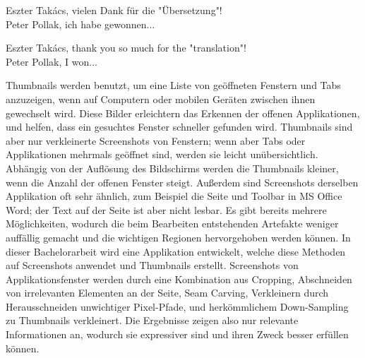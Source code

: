 \documentclass[draft,final]{vutinfth} %
\begin{document}
	
	\frontmatter %
	
	\addstatementpage
	
	\begin{danksagung*}
		Eszter Takács, vielen Dank für die "Übersetzung"! \\
		Peter Pollak, ich habe gewonnen...
	\end{danksagung*}
	
	\begin{acknowledgements*}
		Eszter Takács, thank you so much for the "translation"!\\
		Peter Pollak, I won...
	\end{acknowledgements*}
	
	\begin{kurzfassung} 
		Thumbnails werden benutzt, um eine Liste von geöffneten Fenstern und Tabs anzuzeigen, wenn auf Computern oder mobilen Geräten zwischen ihnen gewechselt wird.
		Diese Bilder erleichtern das Erkennen der offenen Applikationen, und helfen, dass ein gesuchtes Fenster schneller gefunden wird.
		Thumbnails sind aber nur verkleinerte Screenshots von Fenstern; wenn aber Tabs oder Applikationen mehrmals geöffnet sind, werden sie leicht unübersichtlich.
		Abhängig von der Auflösung des Bildschirms werden die Thumbnails kleiner, wenn die Anzahl der offenen Fenster steigt.
		Außerdem sind Screenshots derselben Applikation oft sehr ähnlich, zum Beispiel die Seite und Toolbar in MS Office Word; der Text auf der Seite ist aber nicht lesbar. 
		Es gibt bereits mehrere Möglichkeiten, wodurch die beim Bearbeiten entstehenden Artefakte weniger auffällig gemacht und die wichtigen Regionen hervorgehoben werden können.
		In dieser Bachelorarbeit wird eine Applikation entwickelt, welche diese Methoden auf Screenshots anwendet und Thumbnails erstellt.
		Screenshots von Applikationsfenster werden durch eine Kombination aus Cropping, Abschneiden von irrelevanten Elementen an der Seite, Seam Carving, Verkleinern durch Herausschneiden unwichtiger Pixel-Pfade, und herkömmlichem Down-Sampling zu Thumbnails verkleinert. 
		Die Ergebnisse zeigen also nur relevante Informationen an, wodurch sie expressiver sind und ihren Zweck besser erfüllen können.
		
	\end{kurzfassung}
	
\end{document}
